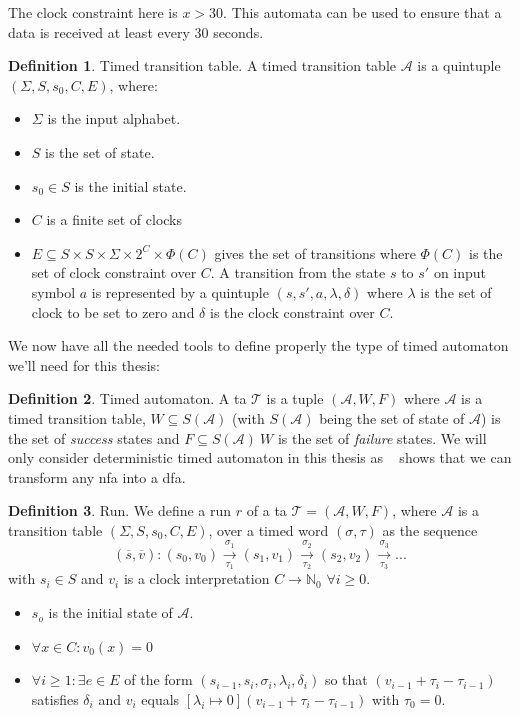 \documentclass[12pt]{article}
\theoremstyle{definition}
\newtheorem{definition}{Definition}[section]
\theoremstyle{definition}
\theoremstyle{remark}
\newcommand{\A}{\mathcal{A}}
\begin{document}
The clock constraint here is $x > 30$. This automata can be used to ensure that a data is received at least every 30 seconds.

\theoremstyle{definition}
\begin{definition}{Timed transition table.} A timed transition table $\A$ is a quintuple $(\Sigma, S, s_{0},C, E)$, where:
\begin{itemize}
\item $\Sigma$ is the input alphabet.
\item $S$ is the set of state.
\item $s_{0} \in S$ is the initial state.
\item $C$ is a finite set of clocks
\item $E \subseteq S \times S \times \Sigma \times 2^{C} \times \Phi(C)$ gives the set of transitions where $\Phi(C)$ is the set of clock constraint over $C$. A transition from the state $s$ to $s'$ on input symbol $a$ is represented by a quintuple $(s, s', a, \lambda, \delta)$ where $\lambda$ is the set of clock to be set to zero and $\delta$ is the clock constraint over $C$.
\end{itemize}
\end{definition}

We now have all the needed tools to define properly the type of timed automaton we'll need for this thesis:

\theoremstyle{definition}
\begin{definition}{Timed automaton.} A \gls{ta} $\mathcal{T}$ is a tuple $(\A, W, F)$ where $\A$ is a timed transition table, $W \subseteq S(\A)$ (with $S(\A)$ being the set of state of $\A$) is the set of \textit{success} states and $F \subseteq S(\A) \ W$ is the set of \textit{failure} states. We will only consider deterministic timed automaton in this thesis as ~\cite{10.1007/3-540-63174-7_12} shows that we can transform any \gls{nfa} into a \gls{dfa}.
\end{definition}

\theoremstyle{definition}
\begin{definition}{Run.} We define a run $r$ of a \gls{ta} $\mathcal{T} = (\A, W, F)$, where $\A$ is a transition table $(\Sigma, S, s_{0},C, E)$, over a timed word $(\sigma, \tau)$ as the sequence
$$(\overline{s}, \overline{v}): (s_0, v_0) \xrightarrow[\tau_1]{\sigma_1} (s_1, v_1) \xrightarrow[\tau_2]{\sigma_2} (s_2, v_2) \xrightarrow[\tau_3]{\sigma_3} ...$$
with $s_i \in S$ and $v_i$ is a clock interpretation $C \to \mathbb{N}_0$ $\forall i \ge 0$.
\begin{itemize}
\item $s_o$ is the initial state of $\A$.
\item $\forall x \in C: v_0(x) = 0$
\item $\forall i \ge 1: \exists e \in E$ of the form $(s_{i-1}, s_i, \sigma_i, \lambda_i, \delta_i)$ so that $(v_{i-1} + \tau_i - \tau_{i-1})$ satisfies $\delta_i$ and $v_i$ equals $[\lambda_i \mapsto 0](v_{i-1} + \tau_i - \tau_{i-1})$ with $\tau_0 = 0$.~\cite{ALUR1994183}
\end{itemize}
\end{definition}
\end{document}
